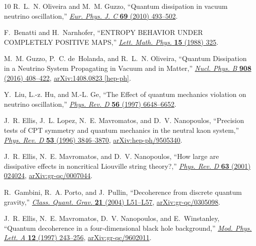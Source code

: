 \documentclass[aps, prd, onecolumn, tightenlines, notitlepage, superscriptaddress, nofootinbib, preprintnumbers, floatfix,showkeys,11pt]{revtex4-2}
\begin{document}
\begin{thebibliography}{10}
R.~L.~N. Oliveira and M.~M. Guzzo, ``{Quantum dissipation in vacuum neutrino
  oscillation},'' \href{http://dx.doi.org/10.1140/epjc/s10052-010-1388-1}{{\em
  Eur. Phys. J. C} {\bfseries 69} (2010) 493--502}.

F.~Benatti and H.~Narnhofer, ``{ENTROPY BEHAVIOR UNDER COMPLETELY POSITIVE
  MAPS},'' \href{http://dx.doi.org/10.1007/BF00419590}{{\em Lett. Math. Phys.}
  {\bfseries 15} (1988) 325}.

M.~M. Guzzo, P.~C. de~Holanda, and R.~L.~N. Oliveira, ``{Quantum Dissipation in
  a Neutrino System Propagating in Vacuum and in Matter},''
  \href{http://dx.doi.org/10.1016/j.nuclphysb.2016.04.030}{{\em Nucl. Phys. B}
  {\bfseries 908} (2016) 408--422},
  \href{http://arxiv.org/abs/1408.0823}{{\ttfamily arXiv:1408.0823 [hep-ph]}}.

Y.~Liu, L.-z. Hu, and M.-L. Ge, ``{The Effect of quantum mechanics violation on
  neutrino oscillation},''
  \href{http://dx.doi.org/10.1103/PhysRevD.56.6648}{{\em Phys. Rev. D}
  {\bfseries 56} (1997) 6648--6652}.

J.~R. Ellis, J.~L. Lopez, N.~E. Mavromatos, and D.~V. Nanopoulos, ``{Precision
  tests of CPT symmetry and quantum mechanics in the neutral kaon system},''
  \href{http://dx.doi.org/10.1103/PhysRevD.53.3846}{{\em Phys. Rev. D}
  {\bfseries 53} (1996) 3846--3870},
  \href{http://arxiv.org/abs/hep-ph/9505340}{{\ttfamily arXiv:hep-ph/9505340}}.

J.~R. Ellis, N.~E. Mavromatos, and D.~V. Nanopoulos, ``{How large are
  dissipative effects in noncritical Liouville string theory?},''
  \href{http://dx.doi.org/10.1103/PhysRevD.63.024024}{{\em Phys. Rev. D}
  {\bfseries 63} (2001) 024024},
  \href{http://arxiv.org/abs/gr-qc/0007044}{{\ttfamily arXiv:gr-qc/0007044}}.

R.~Gambini, R.~A. Porto, and J.~Pullin, ``{Decoherence from discrete quantum
  gravity},'' \href{http://dx.doi.org/10.1088/0264-9381/21/8/L01}{{\em Class.
  Quant. Grav.} {\bfseries 21} (2004) L51--L57},
  \href{http://arxiv.org/abs/gr-qc/0305098}{{\ttfamily arXiv:gr-qc/0305098}}.

J.~R. Ellis, N.~E. Mavromatos, D.~V. Nanopoulos, and E.~Winstanley, ``{Quantum
  decoherence in a four-dimensional black hole background},''
  \href{http://dx.doi.org/10.1142/S0217732397000248}{{\em Mod. Phys. Lett. A}
  {\bfseries 12} (1997) 243--256},
  \href{http://arxiv.org/abs/gr-qc/9602011}{{\ttfamily arXiv:gr-qc/9602011}}.


\end{thebibliography}
\end{document}
